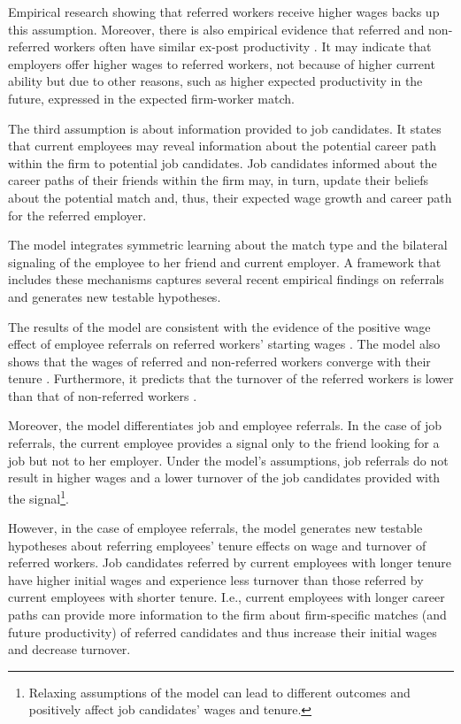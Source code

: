 \documentclass[12pt]{article}
\begin{document}
Empirical research showing that referred workers receive higher wages backs up this assumption. Moreover, there is also empirical evidence that referred and non-referred workers often have similar ex-post productivity \citep{brown2016informal}. It may indicate that employers offer higher wages to referred workers, not because of higher current ability but due to other reasons, such as higher expected productivity in the future, expressed in the expected firm-worker match.

The third assumption is about information provided to job candidates. It states that current employees may reveal information about the potential career path within the firm to potential job candidates. Job candidates informed about the career paths of their friends within the firm may, in turn, update their beliefs about the potential match and, thus, their expected wage growth and career path for the referred employer.

The model integrates symmetric learning about the match type and the bilateral signaling of the employee to her friend and current employer. A framework that includes these mechanisms captures several recent empirical findings on referrals and generates new testable hypotheses.

The results of the model are consistent with the evidence of the positive wage effect of employee referrals on referred workers' starting wages  \citep{brown2016informal, dustmann2016referral, galenianos2013learning, montgomery1991social, simon1992matchmaker, corcoran1980most}. The model also shows that the wages of referred and non-referred workers converge with their tenure \citep{galenianos2013learning, dustmann2016referral, simon1992matchmaker, brown2016informal}. Furthermore, it predicts that the turnover of the referred workers is lower than that of non-referred workers \citep{simon1992matchmaker, dustmann2016referral, brown2016informal}.

Moreover, the model differentiates job and employee referrals. In the case of job referrals, the current employee provides a signal only to the friend looking for a job but not to her employer. Under the model's assumptions, job referrals do not result in higher wages and a lower turnover of the job candidates provided with the signal\footnote{Relaxing assumptions of the model can lead to different outcomes and positively affect job candidates' wages and tenure.}. 

However, in the case of employee referrals, the model generates new testable hypotheses about referring employees' tenure effects on wage and turnover of referred workers. Job candidates referred by current employees with longer tenure have higher initial wages and experience less turnover than those referred by current employees with shorter tenure. I.e., current employees with longer career paths can provide more information to the firm about firm-specific matches (and future productivity) of referred candidates and thus increase their initial wages and decrease turnover.
\end{document}
